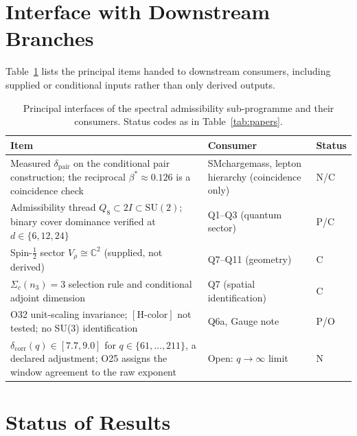 \documentclass[11pt,a4paper]{article}
\theoremstyle{definition}
\newcommand{\SU}{\mathrm{SU}}
\newcommand{\dimpair}{\delta_{\mathrm{pair}}}
\newcommand{\betastar}{\beta^*}
\begin{document}
  \section{Interface with Downstream Branches}
    \label{sec:outputs}

    Table~\ref{tab:outputs} lists the principal items handed to downstream consumers, including
    supplied or conditional inputs rather than only derived outputs.

    \begin{table}[ht]
      \centering
      \caption{Principal interfaces of the spectral admissibility sub-programme and their consumers.
        Status codes as in Table~\ref{tab:papers}.}
      \label{tab:outputs}
      \renewcommand{\arraystretch}{1.3}
      \begin{tabular}{@{}>{\raggedright\arraybackslash}p{5.5cm}
        >{\raggedright\arraybackslash}p{4.5cm}l@{}}
        \toprule
        Item & Consumer & Status \\
        \midrule
        Measured $\dimpair$ on the conditional pair construction; the reciprocal
          $\betastar \approx 0.126$ is a coincidence check
          & SMchargemass, lepton hierarchy (coincidence only) & N/C \\
        Admissibility thread $Q_8 \subset 2I \subset \SU(2)$; binary cover dominance verified at
          $d \in \{6, 12, 24\}$ & Q1--Q3 (quantum sector) & P/C \\
        Spin-$\tfrac{1}{2}$ sector $V_\rho \cong \mathbb{C}^2$ (supplied, not derived) & Q7--Q11 (geometry) & C \\
        $\Sigma_c(n_3) = 3$ selection rule and conditional adjoint dimension
          & Q7 (spatial identification) & C \\
        O32 unit-scaling invariance; $[\mathrm{H\text{-}color}]$ not tested; no SU(3) identification
          & Q6a, Gauge note & P/O \\
        $\delta_{\mathrm{corr}}(q) \in [7.7, 9.0]$ for $q \in \{61,\ldots,211\}$, a declared
          adjustment; O25 assigns the window agreement to the raw exponent
          & Open: $q \to \infty$ limit & N \\
        \bottomrule
      \end{tabular}
    \end{table}

  \section{Status of Results}
    \label{sec:status}
\end{document}
